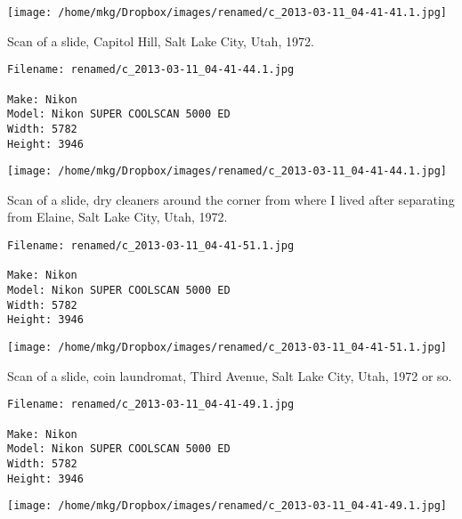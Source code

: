 \begin{landscape}

\texttt{[image: /home/mkg/Dropbox/images/renamed/c\_2013-03-11\_04-41-41.1.jpg]}
\end{landscape}



\noindent Scan of a slide, Capitol Hill, Salt Lake City, Utah, 1972.
\begin{lstlisting}
Filename: renamed/c_2013-03-11_04-41-44.1.jpg

Make: Nikon
Model: Nikon SUPER COOLSCAN 5000 ED
Width: 5782
Height: 3946
\end{lstlisting}

\begin{landscape}

\texttt{[image: /home/mkg/Dropbox/images/renamed/c\_2013-03-11\_04-41-44.1.jpg]}
\end{landscape}



\noindent Scan of a slide, dry cleaners around the corner from where I lived after separating from Elaine, Salt Lake City, Utah, 1972.
\begin{lstlisting}
Filename: renamed/c_2013-03-11_04-41-51.1.jpg

Make: Nikon
Model: Nikon SUPER COOLSCAN 5000 ED
Width: 5782
Height: 3946
\end{lstlisting}

\begin{landscape}

\texttt{[image: /home/mkg/Dropbox/images/renamed/c\_2013-03-11\_04-41-51.1.jpg]}
\end{landscape}



\noindent Scan of a slide, coin laundromat, Third Avenue, Salt Lake City, Utah, 1972 or so.
\begin{lstlisting}
Filename: renamed/c_2013-03-11_04-41-49.1.jpg

Make: Nikon
Model: Nikon SUPER COOLSCAN 5000 ED
Width: 5782
Height: 3946
\end{lstlisting}

\begin{landscape}

\texttt{[image: /home/mkg/Dropbox/images/renamed/c\_2013-03-11\_04-41-49.1.jpg]}
\end{landscape}



